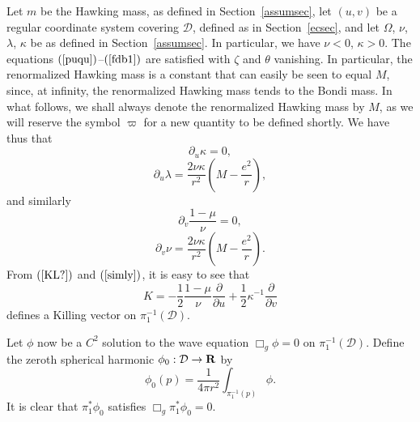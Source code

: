 \documentclass{article}
\begin{document}
Let $m$ be the Hawking mass, as defined in Section~\ref{assumsec},
let $(u,v)$ be a regular coordinate system covering $\mathcal{D}$,
defined as in Section~\ref{ecsec}, and let $\Omega$, $\nu$, $\lambda$, $\kappa$
be as defined in Section~\ref{assumsec}. 
In particular, we have $\nu<0$, $\kappa>0$.
The equations $(\ref{puqu})$--$(\ref{fdb1})$ 
are satisfied with $\zeta$ and $\theta$
vanishing. In particular, the renormalized Hawking mass is a constant
that can easily be seen to equal $M$, since, at infinity, the
renormalized Hawking mass tends to the Bondi mass. 
In what follows, we shall always denote 
the renormalized Hawking mass by $M$,
as we will reserve the symbol $\varpi$ for a new quantity to be defined
shortly. 
We have thus that
\begin{equation}
\label{KL?}
\partial_u\kappa=0,
\end{equation}
\begin{equation}
\label{lqu-u}
\partial_u\lambda=\frac{2\nu\kappa}{r^2}\left(M-\frac{e^2}r\right),
\end{equation}
and similarly
\begin{equation}
\label{simly}
\partial_v\frac{1-\mu}{\nu}=0,
\end{equation}
\begin{equation}
\label{nqu-u}
\partial_v\nu=\frac{2\nu\kappa}{r^2}\left(M-\frac{e^2}r\right).
\end{equation}
From $(\ref{KL?})$ and $(\ref{simly})$, 
it is easy to see that
\[
K=-\frac12\frac{1-\mu}\nu\frac\partial{\partial u}
+\frac12\kappa^{-1}\frac\partial{\partial v}
\]
defines a Killing vector on $\pi_1^{-1}(\mathcal{D})$.

Let $\phi$ now be a $C^2$ solution to the wave equation $\Box_g\phi=0$
on $\pi_1^{-1}(\mathcal{D})$. Define the zeroth spherical harmonic
$\phi_0:\mathcal{D}\to{\bf R}$ by 
\[
\phi_0(p)=\frac{1}{4\pi r^2}\int_{\pi_1^{-1}(p)}\phi.
\]
It is clear that
$\pi_1^*\phi_0$ satisfies $\Box_g\pi_1^*\phi_0=0$.
\end{document}
